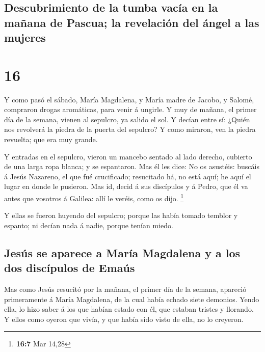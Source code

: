 \hypertarget{descubrimiento-de-la-tumba-vacuxeda-en-la-mauxf1ana-de-pascua-la-revelaciuxf3n-del-uxe1ngel-a-las-mujeres}{%
\subsection{Descubrimiento de la tumba vacía en la mañana de Pascua; la
revelación del ángel a las
mujeres}\label{descubrimiento-de-la-tumba-vacuxeda-en-la-mauxf1ana-de-pascua-la-revelaciuxf3n-del-uxe1ngel-a-las-mujeres}}

\hypertarget{section-15}{%
\section{16}\label{section-15}}

 Y como pasó el sábado, María Magdalena, y María madre de
Jacobo, y Salomé, compraron drogas aromáticas, para venir á ungirle.
 Y muy de mañana, el primer día de la semana, vienen al
sepulcro, ya salido el sol.  Y decían entre sí: ¿Quién nos
revolverá la piedra de la puerta del sepulcro?  Y como
miraron, ven la piedra revuelta; que era muy grande.

 Y entradas en el sepulcro, vieron un mancebo sentado al
lado derecho, cubierto de una larga ropa blanca; y se espantaron.
 Mas él les dice: No os asustéis: buscáis á Jesús Nazareno,
el que fué crucificado; resucitado há, no está aquí; he aquí el lugar en
donde le pusieron.  Mas id, decid á sus discípulos y á
Pedro, que él va antes que vosotros á Galilea: allí le veréis, como os
dijo. \footnote{\textbf{16:7} Mar 14,28}

 Y ellas se fueron huyendo del sepulcro; porque las había
tomado temblor y espanto; ni decían nada á nadie, porque tenían miedo.

\hypertarget{jesuxfas-se-aparece-a-maruxeda-magdalena-y-a-los-dos-discuxedpulos-de-emauxfas}{%
\subsection{Jesús se aparece a María Magdalena y a los dos discípulos de
Emaús}\label{jesuxfas-se-aparece-a-maruxeda-magdalena-y-a-los-dos-discuxedpulos-de-emauxfas}}

 Mas como Jesús resucitó por la mañana, el primer día de la
semana, apareció primeramente á María Magdalena, de la cual había echado
siete demonios.  Yendo ella, lo hizo saber á los que habían
estado con él, que estaban tristes y llorando.  Y ellos
como oyeron que vivía, y que había sido visto de ella, no lo creyeron.

